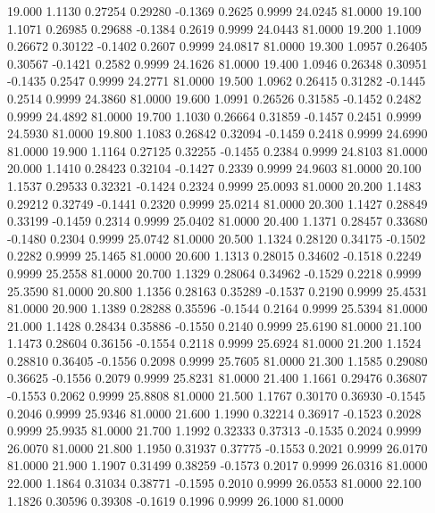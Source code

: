   19.000   1.1130   0.27254   0.29280  -0.1369   0.2625   0.9999  24.0245  81.0000
  19.100   1.1071   0.26985   0.29688  -0.1384   0.2619   0.9999  24.0443  81.0000
  19.200   1.1009   0.26672   0.30122  -0.1402   0.2607   0.9999  24.0817  81.0000
  19.300   1.0957   0.26405   0.30567  -0.1421   0.2582   0.9999  24.1626  81.0000
  19.400   1.0946   0.26348   0.30951  -0.1435   0.2547   0.9999  24.2771  81.0000
  19.500   1.0962   0.26415   0.31282  -0.1445   0.2514   0.9999  24.3860  81.0000
  19.600   1.0991   0.26526   0.31585  -0.1452   0.2482   0.9999  24.4892  81.0000
  19.700   1.1030   0.26664   0.31859  -0.1457   0.2451   0.9999  24.5930  81.0000
  19.800   1.1083   0.26842   0.32094  -0.1459   0.2418   0.9999  24.6990  81.0000
  19.900   1.1164   0.27125   0.32255  -0.1455   0.2384   0.9999  24.8103  81.0000
  20.000   1.1410   0.28423   0.32104  -0.1427   0.2339   0.9999  24.9603  81.0000
  20.100   1.1537   0.29533   0.32321  -0.1424   0.2324   0.9999  25.0093  81.0000
  20.200   1.1483   0.29212   0.32749  -0.1441   0.2320   0.9999  25.0214  81.0000
  20.300   1.1427   0.28849   0.33199  -0.1459   0.2314   0.9999  25.0402  81.0000
  20.400   1.1371   0.28457   0.33680  -0.1480   0.2304   0.9999  25.0742  81.0000
  20.500   1.1324   0.28120   0.34175  -0.1502   0.2282   0.9999  25.1465  81.0000
  20.600   1.1313   0.28015   0.34602  -0.1518   0.2249   0.9999  25.2558  81.0000
  20.700   1.1329   0.28064   0.34962  -0.1529   0.2218   0.9999  25.3590  81.0000
  20.800   1.1356   0.28163   0.35289  -0.1537   0.2190   0.9999  25.4531  81.0000
  20.900   1.1389   0.28288   0.35596  -0.1544   0.2164   0.9999  25.5394  81.0000
  21.000   1.1428   0.28434   0.35886  -0.1550   0.2140   0.9999  25.6190  81.0000
  21.100   1.1473   0.28604   0.36156  -0.1554   0.2118   0.9999  25.6924  81.0000
  21.200   1.1524   0.28810   0.36405  -0.1556   0.2098   0.9999  25.7605  81.0000
  21.300   1.1585   0.29080   0.36625  -0.1556   0.2079   0.9999  25.8231  81.0000
  21.400   1.1661   0.29476   0.36807  -0.1553   0.2062   0.9999  25.8808  81.0000
  21.500   1.1767   0.30170   0.36930  -0.1545   0.2046   0.9999  25.9346  81.0000
  21.600   1.1990   0.32214   0.36917  -0.1523   0.2028   0.9999  25.9935  81.0000
  21.700   1.1992   0.32333   0.37313  -0.1535   0.2024   0.9999  26.0070  81.0000
  21.800   1.1950   0.31937   0.37775  -0.1553   0.2021   0.9999  26.0170  81.0000
  21.900   1.1907   0.31499   0.38259  -0.1573   0.2017   0.9999  26.0316  81.0000
  22.000   1.1864   0.31034   0.38771  -0.1595   0.2010   0.9999  26.0553  81.0000
  22.100   1.1826   0.30596   0.39308  -0.1619   0.1996   0.9999  26.1000  81.0000
